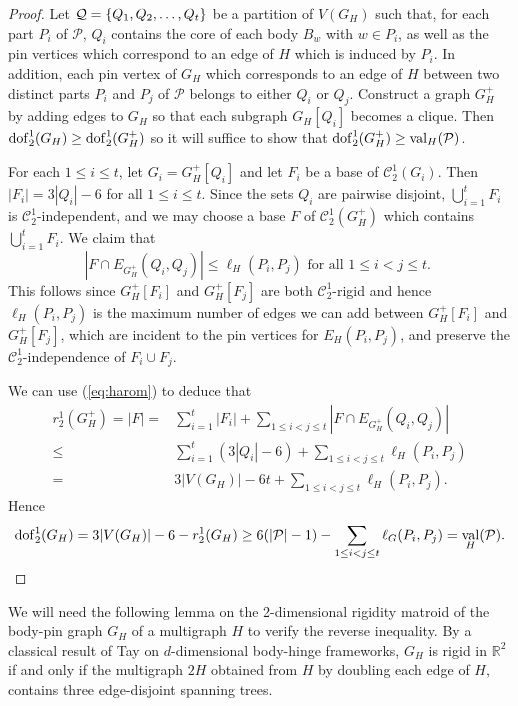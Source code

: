 \documentclass[11pt,a4paper]{article}
\theoremstyle{definition}
\DeclareMathOperator{\val}{val}
\newcommand{\dof}{{\rm dof}}
\newcommand{\R}{\mathbb{R}}
\newcommand{\cC}{\mathcal{C}}
\newcommand{\cP}{\mathcal{P}}
\begin{document}
\begin{proof}
Let ${\cal Q}=\{Q_1,Q_2,\dots,Q_t\}$ be a partition of $V(G_H)$ such that, for each part  $P_i$ of $\cP$,
$Q_i$ contains the core of each body $B_w$ with $w\in P_i$,  as well as
the pin vertices which correspond to an edge of $H$ which is induced by $P_i$.
In addition, each pin vertex of $G_H$ which corresponds to an edge of $H$
between two distinct parts $P_i$ and $P_j$ of $\cP$ belongs to either $Q_i$ or $Q_j$.
Construct a graph $G_H^+$ by adding edges to $G_H$ so that each subgraph $G_H[Q_i]$ becomes a clique. Then $\dof_2^1(G_H)\geq\dof_2^1(G_H^+)$ so
it will suffice to show that $\dof_2^1(G_H^+) \geq \val_H({\cal P})$.


For each $1\leq i\leq t$, let $G_i=G_H^+[Q_i]$ and
let $F_i$ be a base of $\cC^1_2(G_i)$. Then $|F_i|=3|Q_i|-6$ for all $1\leq i\leq t$. Since the sets $Q_i$ are pairwise disjoint, $\bigcup_{i=1}^t F_i$ is $\cC^1_2$-independent, and we may choose  a base $F$ of $\cC^1_2(G_H^+)$ which contains
$\bigcup_{i=1}^t F_i$. We claim that 
\begin{equation}\label{eq:harom}
|F\cap E_{G_H^+}(Q_i,Q_j)|\leq \ell_H(P_i,P_j) \mbox{ for all $1\leq i<j\leq t$. }
\end{equation}
This follows since $G_H^+[F_i]$ and $ G_H^+[F_j]$ are both $\cC_2^1$-rigid and  hence $\ell_H(P_i,P_j)$ is the maximum number of edges  we can add between $G_H^+[F_i]$ and $G_H^+[F_j]$, which are incident to the pin vertices for $E_H(P_i,P_j)$, and preserve the $\cC_2^1$-independence of $F_i\cup F_j$.

We can use (\ref{eq:harom}) to deduce that 
\begin{align*}
r_2^1(G_H^+)=|F|=&\sum_{i=1}^t |F_i| + \sum_{1\leq i<j\leq t} |F\cap E_{G_H^+}(Q_i,Q_j)|\\
\leq&\sum_{i=1}^t (3|Q_i|-6) + \sum_{1\leq i<j\leq t} \ell_H(P_i,P_j)\\
=& 3|V(G_H)|-6t + \sum_{1\leq i<j\leq t} \ell_H(P_i,P_j).
\end{align*}
Hence
$$\dof_2^1(G_H)=3|V(G_H)|-6-r_2^1(G_H)\geq 6(|{\cal P}|-1) -\sum_{1\leq i<j\leq t} \ell_G(P_i,P_j)=\val_H({\cal P}).$$
\end{proof}

	

We will need the
following lemma on the 2-dimensional 
rigidity matroid of the body-pin graph $G_H$ of a multigraph $H$ to verify the reverse inequality.
By a classical result of Tay \cite{tay} on $d$-dimensional body-hinge frameworks, $G_H$ is rigid in $\R^2$ if and only if the multigraph
$2H$ obtained from $H$
by doubling each edge of $H$, contains three edge-disjoint spanning trees. 
\end{document}
